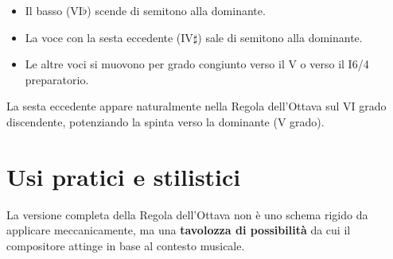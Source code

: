 \begin{regola}
    \label{reg:risoluzione_sesta_eccedente}
    \begin{itemize}
        \item Il basso (VI$\flat$) scende di semitono alla dominante.
        \item La voce con la sesta eccedente (IV$\sharp$) sale di semitono alla dominante.
        \item Le altre voci si muovono per grado congiunto verso il V o verso il I6/4 preparatorio.
    \end{itemize}
\end{regola}

La sesta eccedente appare naturalmente nella Regola dell'Ottava sul VI grado discendente, potenziando la spinta verso la dominante (V grado).

\section{Usi pratici e stilistici}
\label{sec:usi_pratici_completi}

La versione completa della Regola dell'Ottava non è uno schema rigido da applicare meccanicamente, ma una \textbf{tavolozza di possibilità} da cui il compositore attinge in base al contesto musicale.

